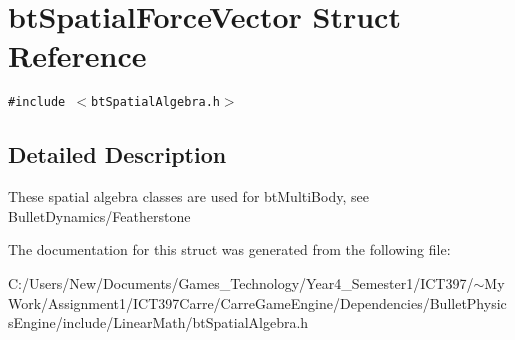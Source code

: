 \hypertarget{structbt_spatial_force_vector}{
\section{btSpatialForceVector Struct Reference}
\label{structbt_spatial_force_vector}
}
{\tt \#include $<$btSpatialAlgebra.h$>$}



\subsection{Detailed Description}
These spatial algebra classes are used for btMultiBody, see BulletDynamics/Featherstone 

The documentation for this struct was generated from the following file:\begin{CompactItemize}
\item 
C:/Users/New/Documents/Games\_\-Technology/Year4\_\-Semester1/ICT397/$\sim$My Work/Assignment1/ICT397Carre/CarreGameEngine/Dependencies/BulletPhysicsEngine/include/LinearMath/btSpatialAlgebra.h\end{CompactItemize}
